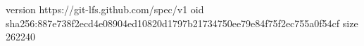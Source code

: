 version https://git-lfs.github.com/spec/v1
oid sha256:887e738f2ecd4e08904ed10820d1797b21734750ee79e84f75f2ec755a0f54cf
size 262240
